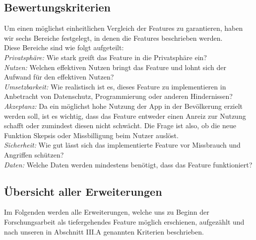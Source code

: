\documentclass[conference]{IEEEtran}
\begin{document}
\subsection{Bewertungskriterien}

Um einen möglichst einheitlichen Vergleich der Features zu garantieren, haben wir sechs Bereiche festgelegt, in denen die Features beschrieben werden.\\
Diese Bereiche sind wie folgt aufgeteilt:\\
\textit{Privatsphäre:} Wie stark greift das Feature in die Privatsphäre ein?\\
\textit{Nutzen:} Welchen effektiven Nutzen bringt das Feature und lohnt sich der Aufwand für den effektiven Nutzen?\\
\textit{Umsetzbarkeit:} Wie realistisch ist es, dieses Feature zu implementieren in Anbetracht von Datenschutz, Programmierung oder anderen Hindernissen?\\
\textit{Akzeptanz:} Da ein möglichst hohe Nutzung der App in der Bevölkerung erzielt werden soll, ist es wichtig, dass das Feature entweder einen Anreiz zur Nutzung schafft oder zumindest diesen nicht schwächt. Die Frage ist also, ob die neue Funktion Skepsis oder Missbilligung beim Nutzer auslöst.\\
\textit{Sicherheit:} Wie gut lässt sich das implementierte Feature vor Missbrauch und Angriffen schützen?\\
\textit{Daten:} Welche Daten werden mindestens benötigt, dass das Feature funktioniert?\\


\subsection{Übersicht aller Erweiterungen}

Im Folgenden werden alle Erweiterungen, welche uns zu Beginn der Forschungsarbeit als tiefergehendes Feature möglich erschienen, aufgezählt und nach unseren in Abschnitt III.A genannten Kriterien beschrieben.\\
\end{document}
